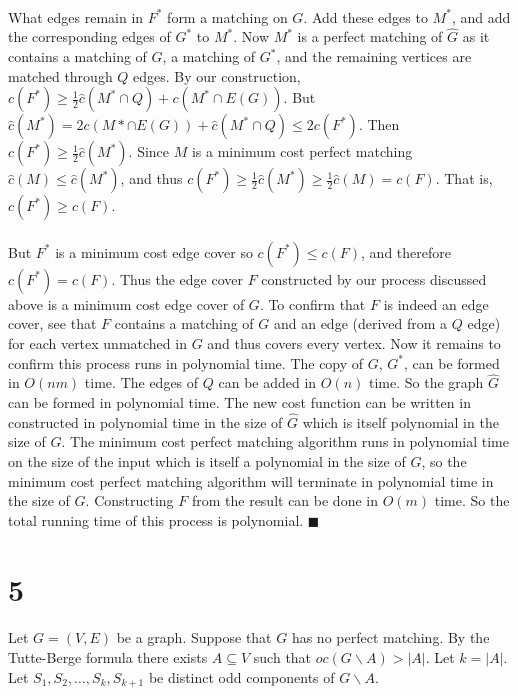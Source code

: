 \documentclass[letterpaper,12pt,oneside,onecolumn]{report}
\begin{document}
\paragraph{}
What edges remain in $F^*$ form a matching on $G$. Add these edges to $M^*$, and add the corresponding edges of $G^*$ to $M^*$. Now $M^*$ is a perfect matching of $\hat{G}$ as it contains a matching of $G$, a matching of $G^*$, and the remaining vertices are matched through $Q$ edges. By our construction, $c(F^*) \geq \frac{1}{2}\hat{c}(M^* \cap Q) + c(M^* \cap E(G))$. But $\hat{c}(M^*) = 2c(M* \cap E(G)) + \hat{c}(M^* \cap Q) \leq 2c(F^*)$. Then $c(F^*) \geq \frac{1}{2} \hat{c}(M^*)$. Since $M$ is a minimum cost perfect matching $\hat{c}(M) \leq \hat{c}(M^*)$, and thus $c(F^*) \geq \frac{1}{2} \hat{c}(M^*) \geq \frac{1}{2}\hat{c}(M) = c(F)$. That is, $c(F^*) \geq c(F)$.
\paragraph{}
But $F^*$ is a minimum cost edge cover so $c(F^*) \leq c(F)$, and therefore $c(F^*) = c(F)$. Thus the edge cover $F$ constructed by our process discussed above is a minimum cost edge cover of $G$. To confirm that $F$ is indeed an edge cover, see that $F$ contains a matching of $G$ and an edge (derived from a $Q$ edge) for each vertex unmatched in $G$ and thus covers every vertex. Now it remains to confirm this process runs in polynomial time. The copy of $G$, $G^*$, can be formed in $O(nm)$ time. The edges of $Q$ can be added in $O(n)$ time. So the graph $\hat{G}$ can be formed in polynomial time. The new cost function can be written in constructed in polynomial time in the size of $\hat{G}$ which is itself polynomial in the size of $G$. The minimum cost perfect matching algorithm runs in polynomial time on the size of the input which is itself a polynomial in the size of $G$, so the minimum cost perfect matching algorithm will terminate in polynomial time in the size of $G$. Constructing $F$ from the result can be done in $O(m)$ time. So the total running time of this process is polynomial. $\blacksquare$

\section*{5}
\paragraph{}
Let $G=(V,E)$ be a graph. Suppose that $G$ has no perfect matching. By the Tutte-Berge formula there exists $A \subseteq V$ such that $oc(G\backslash A) > |A|$. Let $k = |A|$. Let $S_1, S_2, \dots, S_k, S_{k+1}$ be distinct odd components of $G\backslash A$.
\end{document}
